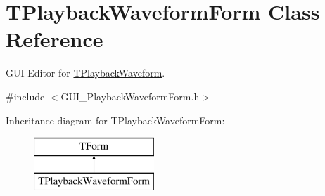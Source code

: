 \hypertarget{class_t_playback_waveform_form}{\section{T\+Playback\+Waveform\+Form Class Reference}
\label{class_t_playback_waveform_form}
}


G\+U\+I Editor for \hyperlink{class_t_playback_waveform}{T\+Playback\+Waveform}.  




{\ttfamily \#include $<$G\+U\+I\+\_\+\+Playback\+Waveform\+Form.\+h$>$}

Inheritance diagram for T\+Playback\+Waveform\+Form\+:\begin{figure}[H]
\begin{center}
\leavevmode
\includegraphics[height=2.000000cm]{class_t_playback_waveform_form}
\end{center}
\end{figure}
